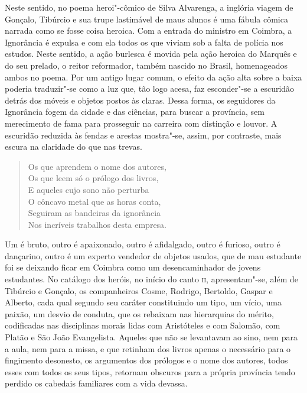 Neste sentido, no poema heroi"-cômico de Silva Alvarenga, a inglória viagem de
Gonçalo, Tibúrcio e sua trupe lastimável de maus alunos é uma fábula cômica
narrada como se fosse coisa heroica.  Com a entrada do ministro em Coimbra, a
Ignorância é expulsa e com ela todos os que viviam sob a falta de polícia nos
estudos.  Neste sentido, a ação burlesca é movida pela ação heroica do Marquês e
do seu prelado, o reitor reformador, também nascido no Brasil, homenageados
ambos no poema. Por um antigo lugar comum, o efeito da ação alta sobre a baixa
poderia traduzir"-se como a luz que, tão logo acesa, faz esconder"-se a escuridão
detrás dos móveis e objetos postos às claras.  Dessa forma, os seguidores da
Ignorância fogem da cidade e das ciências, para buscar a província, sem
merecimento de fama para prosseguir na carreira com distinção e louvor. A
escuridão reduzida às fendas e arestas mostra"-se, assim, por contraste, mais
escura na claridade do que nas trevas.

\pagebreak

\begin{verse}
Os que aprendem o nome dos autores, \\
Os que leem só o prólogo dos livros, \\
E aqueles cujo sono não perturba \\
O côncavo metal que as horas conta, \\
Seguiram as bandeiras da ignorância \\
Nos incríveis trabalhos desta empresa.
\end{verse}

Um é bruto, outro é apaixonado, outro é afidalgado, outro é furioso, outro é
dançarino, outro é um experto vendedor de objetos usados, que de mau estudante
foi se deixando ficar em Coimbra como um desencaminhador de jovens estudantes.
No catálogo dos heróis, no início do canto \textsc{ii}, apresentam"-se, além de
Tibúrcio e Gonçalo, os companheiros Cosme, Rodrigo, Bertoldo, Gaspar e Alberto,
cada qual segundo seu caráter constituindo um tipo, um vício, uma paixão, um
desvio de conduta, que os rebaixam nas hierarquias do mérito, codificadas nas
disciplinas morais lidas com Aristóteles e com Salomão, com Platão e São João
Evangelista.  Aqueles que não se levantavam ao sino, nem para a aula, nem para a
missa, e que retinham dos livros apenas o necessário para o fingimento
desonesto, os argumentos dos prólogos e o nome dos autores, todos esses com
todos os seus tipos, retornam obscuros para a própria província tendo perdido os
cabedais familiares com a vida devassa. 

